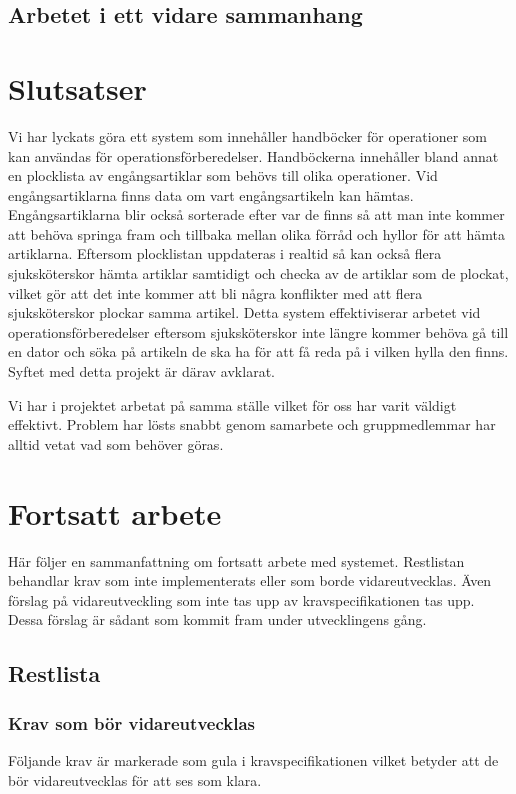\documentclass{article}
\begin{document}
\subsection{Arbetet i ett vidare sammanhang}

\section{Slutsatser}
Vi har lyckats göra ett system som innehåller handböcker för operationer som kan användas för operationsförberedelser. Handböckerna innehåller bland annat en plocklista av engångsartiklar som behövs till olika operationer. Vid engångsartiklarna finns data om vart engångsartikeln kan hämtas. Engångsartiklarna blir också sorterade efter var de finns så att man inte kommer att behöva springa fram och tillbaka mellan olika förråd och hyllor för att hämta artiklarna. Eftersom plocklistan uppdateras i realtid så kan också flera sjuksköterskor hämta artiklar samtidigt och checka av de artiklar som de plockat, vilket gör att det inte kommer att bli några konflikter med att flera sjuksköterskor plockar samma artikel. Detta system effektiviserar arbetet vid operationsförberedelser eftersom sjuksköterskor inte längre kommer behöva gå till en dator och söka på artikeln de ska ha för att få reda på i vilken hylla den finns. Syftet med detta projekt är därav avklarat.

Vi har i projektet arbetat på samma ställe vilket för oss har varit väldigt effektivt. Problem har lösts snabbt genom samarbete och gruppmedlemmar har alltid vetat vad som behöver göras.

\section{Fortsatt arbete}
Här följer en sammanfattning om fortsatt arbete med systemet. Restlistan behandlar krav som inte implementerats eller som borde vidareutvecklas. Även förslag på vidareutveckling som inte tas upp av kravspecifikationen tas upp. Dessa förslag är sådant som kommit fram under utvecklingens gång.

\subsection{Restlista}
\subsubsection{Krav som bör vidareutvecklas}
Följande krav är markerade som gula i kravspecifikationen vilket betyder att de bör vidareutvecklas för att ses som klara.
\end{document}
